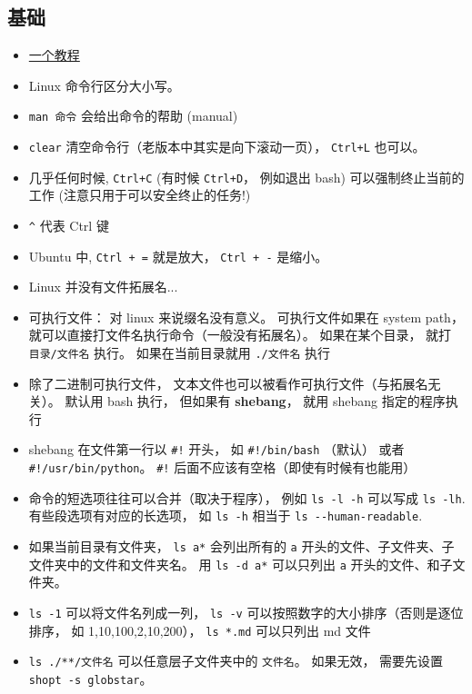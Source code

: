 

\subsection{基础}
\begin{itemize}
\item \href{http://faculty.salina.k-state.edu/tim/unix_sg/index.html}{一个教程}
\item Linux 命令行区分大小写。
\item \verb`man 命令`  会给出命令的帮助 (manual)
\item \verb`clear` 清空命令行（老版本中其实是向下滚动一页）， \verb`Ctrl+L` 也可以。
\item 几乎任何时候, \verb`Ctrl+C` (有时候 \verb`Ctrl+D`， 例如退出 bash) 可以强制终止当前的工作 (注意只用于可以安全终止的任务!)
\item \verb`^` 代表 Ctrl 键
\item Ubuntu 中, \verb`Ctrl + =` 就是放大， \verb`Ctrl + -` 是缩小。
\item Linux 并没有文件拓展名...
\item 可执行文件： 对 linux 来说缀名没有意义。 可执行文件如果在 system path， 就可以直接打文件名执行命令（一般没有拓展名）。 如果在某个目录， 就打 \verb`目录/文件名` 执行。 如果在当前目录就用 \verb`./文件名` 执行
\item 除了二进制可执行文件， 文本文件也可以被看作可执行文件（与拓展名无关）。 默认用 bash 执行， 但如果有 \textbf{shebang}， 就用 shebang 指定的程序执行
\item shebang 在文件第一行以 \verb`#!` 开头， 如 \verb`#!/bin/bash` （默认） 或者 \verb`#!/usr/bin/python`。 \verb`#!` 后面不应该有空格（即使有时候有也能用）
\item 命令的短选项往往可以合并（取决于程序）， 例如 \verb`ls -l -h` 可以写成 \verb`ls -lh`. 有些段选项有对应的长选项， 如 \verb`ls -h` 相当于 \verb`ls --human-readable`.
\item 如果当前目录有文件夹， \verb`ls a*` 会列出所有的 \verb`a` 开头的文件、子文件夹、子文件夹中的文件和文件夹名。 用 \verb`ls -d a*` 可以只列出 \verb`a` 开头的文件、和子文件夹。
\item \verb`ls -1` 可以将文件名列成一列， \verb`ls -v` 可以按照数字的大小排序（否则是逐位排序， 如 1,10,100,2,10,200）， \verb`ls *.md` 可以只列出 md 文件
\item \verb`ls ./**/文件名` 可以任意层子文件夹中的 \verb`文件名`。 如果无效， 需要先设置 \verb`shopt -s globstar`。

\end{itemize}
